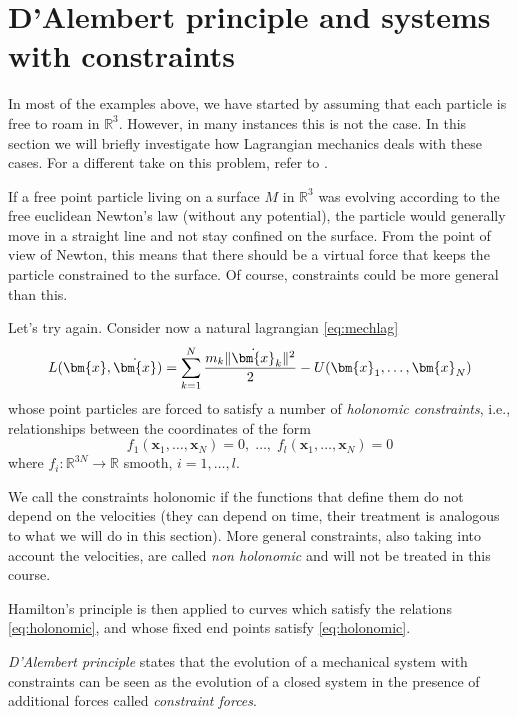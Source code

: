 \documentclass[english,fontsize=11pt,paper=a5,oneside]{scrbook}
\newcommand{\R}{\mathbb{R}}
\newcommand{\bx}{\bm{x}}
\theoremstyle{definition}
\newenvironment{remark}
  {\pushQED{\qed}\renewcommand{\qedsymbol}{$\lozenge$}\remarkx}
  {\popQED\endremarkx}
\begin{document}
\section{D'Alembert principle and systems with constraints}\label{sec:LagrangeConstraints}

In most of the examples above, we have started by assuming that each particle is free to roam in $\R^3$.
However, in many instances this is not the case.
In this section we will briefly investigate how Lagrangian mechanics deals with these cases. For a different take on this problem, refer to \cite[Chapter 21]{book:arnold}.

If a free point particle living on a surface $M$ in $\R^3$ was evolving according to the free euclidean Newton's law (without any potential), the particle would generally move in a straight line and not stay confined on the surface.
From the point of view of Newton, this means that there should be a virtual force that keeps the particle constrained to the surface. Of course, constraints could be more general than this.

Let's try again. Consider now a natural lagrangian \eqref{eq:mechlag}
\begin{equation}
  L(\bx, \dot\bx) = \sum_{k=1}^N \frac{m_k \|\dot \bx_k\|^2}{2} - U(\bx_1, \ldots, \bx_N)
\end{equation}
whose point particles are forced to satisfy a number of \emph{holonomic constraints}, i.e., relationships between the coordinates of the form
\begin{equation}\label{eq:holonomic}
  f_1(\bx_1, \ldots,\bx_N) = 0, \;\ldots,\; f_l(\bx_1, \ldots,\bx_N) = 0
\end{equation}
where $f_i : \R^{3N}\to\R$ smooth, $i=1,\ldots,l$.

\begin{remark}
  We call the constraints holonomic if the functions that define them do not depend on the velocities (they can depend on time, their treatment is analogous to what we will do in this section). More general constraints, also taking into account the velocities, are called \emph{non holonomic} and will not be treated in this course.
\end{remark}

Hamilton's principle is then applied to curves which satisfy the relations \eqref{eq:holonomic}, and whose fixed end points satisfy \eqref{eq:holonomic}.

\begin{tcolorbox}
  \emph{D'Alembert principle} states that the evolution of a mechanical system with constraints can be seen as the evolution of a closed system in the presence of additional forces called \emph{constraint forces}.
\end{tcolorbox}
\end{document}
